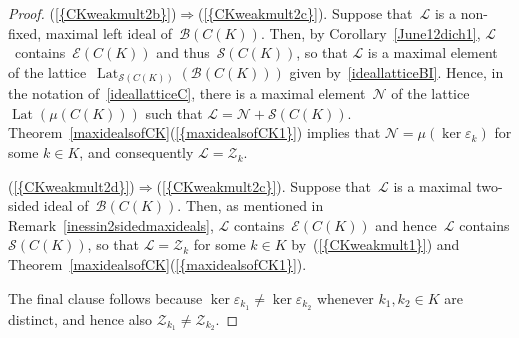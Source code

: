 \documentclass[12pt]{amsart}
\theoremstyle{definition}
\numberwithin{equation}{section}
\begin{document}
\begin{proof}
  {{\normalfont\textrm{(\ref{{CKweakmult2b}})}}}$\Rightarrow${{\normalfont\textrm{(\ref{{CKweakmult2c}})}}}.  Suppose
  that~$\mathscr{L}$ is a non-fixed, maximal left ideal
  of~$\mathscr{B}(C(K))$. Then, by Corollary~\ref{June12dich1},
  $\mathscr{L}$~con\-tains~$\mathscr{E}(C(K))$ and
  thus~$\mathscr{S}(C(K))$, so that $\mathscr{L}$ is a maximal element
  of the
  lattice~$\operatorname{Lat}_{\mathscr{S}(C(K))}(\mathscr{B}(C(K)))$
  given by~\eqref{ideallatticeBI}. Hence, in the notation
  of~\eqref{ideallatticeC}, there is a maximal element~$\mathscr{N}$
  of the lattice~$\operatorname{Lat}(\mu(C(K)))$ such that
  $\mathscr{L} = \mathscr{N} + \mathscr{S}(C(K))$.
  Theorem~\ref{maxidealsofCK}{{\normalfont\textrm{(\ref{{maxidealsofCK1}})}}} implies that
  $\mathscr{N} = \mu(\ker{\ensuremath{\varepsilon}}_k)$ for some $k\in K$, and
  consequently $\mathscr{L} = \mathscr{Z}_k$.

  {{\normalfont\textrm{(\ref{{CKweakmult2d}})}}}$\Rightarrow${{\normalfont\textrm{(\ref{{CKweakmult2c}})}}}. Suppose
  that~$\mathscr{L}$ is a maximal two-sided ideal
  of~$\mathscr{B}(C(K))$. Then, as mentioned in
  Remark~\ref{inessin2sidedmaxideals}, $\mathscr{L}$
  contains~$\mathscr{E}(C(K))$ and hence~$\mathscr{L}$ contains
  $\mathscr{S}(C(K))$, so that $\mathscr{L} = \mathscr{Z}_k$ for some
  $k\in K$ by~{{\normalfont\textrm{(\ref{{CKweakmult1}})}}} and
  Theorem~\ref{maxidealsofCK}{{\normalfont\textrm{(\ref{{maxidealsofCK1}})}}}.

  The final clause follows because
  $\ker{\ensuremath{\varepsilon}}_{k_1}\neq\ker{\ensuremath{\varepsilon}}_{k_2}$ whenever $k_1,k_2\in K$
  are distinct, and hence also
  $\mathscr{Z}_{k_1}\neq\mathscr{Z}_{k_2}$.
\end{proof}
\end{document}
